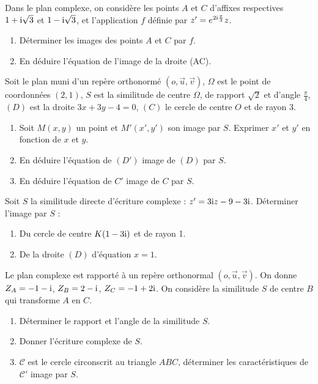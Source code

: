 \begin{exercice}
Dans le plan complexe, on consid\`ere les points $A$ et $C$ d'affixes respectives $1 + \text{i}\sqrt{3}$ et $1 - \text{i}\sqrt{3}$, et l'application $f$ définie par $z' = e^{2\text{i}\frac{\pi}{3}}z$.
\begin{enumerate}
  \item D\'eterminer les images des points $A$ et $C$ par $f$.
  \item En d\'eduire l'\'equation de l'image de la droite (AC).
\end{enumerate}
\end{exercice}

\begin{exercice}
Soit le plan muni d'un rep\`ere orthonorm\'e $(o, \vec{u}, \vec{v})$, $\Omega$ est le point de coordonn\'ees $(2,1)$, $S$ est la similitude de centre $\Omega$, de rapport $\sqrt{2}$ et d'angle $\frac{\pi}{4}$, $(D)$ est la droite $3x + 3y - 4 = 0$, $(C)$ le cercle de centre $O$ et de rayon 3.
\begin{enumerate}
  \item Soit $M(x,y)$ un point et $M'(x',y')$ son image par $S$. Exprimer $x'$ et $y'$ en fonction de $x$ et $y$.
  \item En d\'eduire l'\'equation de $(D')$ image de $(D)$ par $S$.
  \item En d\'eduire l'\'equation de $C'$ image de $C$ par $S$.
\end{enumerate}
\end{exercice}

\begin{exercice}
Soit $S$ la similitude directe d'\'ecriture complexe : $z' = 3\text{i} z - 9 - 3\text{i}$. D\'eterminer l'image par $S$ :
\begin{enumerate}
  \item Du cercle de centre $K(1 - 3\text{i})$ et de rayon 1.
  \item De la droite $(D)$ d'\'equation $x = 1$.
\end{enumerate}
\end{exercice}

\begin{exercice}
Le plan complexe est rapport\'e \`a un rep\`ere orthonormal $(o, \vec{u}, \vec{v})$. On donne $Z_A = -1 - \text{i}$, $Z_B = 2 - \text{i}$, $Z_C = -1 + 2\text{i}$. On consid\`ere la similitude $S$ de centre $B$ qui transforme $A$ en $C$.
\begin{enumerate}
  \item D\'eterminer le rapport et l'angle de la similitude $S$.
  \item Donner l'\'ecriture complexe de $S$.
  \item $\mathcal{C}$ est le cercle circonscrit au triangle $ABC$, d\'eterminer les caract\'eristiques de $\mathcal{C}'$ image par $S$.
\end{enumerate}
\end{exercice}

